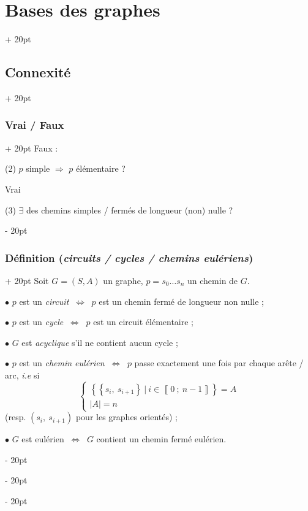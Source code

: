 \documentclass[a4paper, 12pt, twoside]{article}
\newcommand{\nset}[2]{\left\llbracket #1\ ;\ #2 \right\rrbracket}
\newcommand{\set}[1]{\left\{ #1 \right\}}
\newcommand{\abs}[1]{\left\lvert #1 \right\rvert}
\newcommand{\ssi}{\ \Leftrightarrow \ }
\newcommand{\eqsys}[2]{\begin{cases} #1 \\ #2 \end{cases}}
\newcommand{\ind}[1][20pt]{\advance\leftskip + #1}
\newcommand{\deind}[1][20pt]{\advance\leftskip - #1}
\newenvironment{indt}[2][20pt]{#2 \par \ind[#1]}{\par \deind} %
\begin{document}
\begin{indt}{\section{Bases des graphes}}
\begin{indt}{\subsection{Connexité}}
\begin{indt}{\subsubsection{Vrai / Faux}}
                Faux :

                \begin{center}
                \end{center}

                \vspace{12pt}
                
                (2) $p$ simple $\Rightarrow$ $p$ élémentaire ?

                Vrai

                (3) $\exists$ des chemins simples / fermés de longueur (non) nulle ?
            \end{indt}

            \vspace{12pt}
            
            \begin{indt}{\subsubsection{Définition (\textit{circuits / cycles / chemins eulériens})}}
                Soit $G = (S, A)$ un graphe, $p = s_0 \ldots s_n$ un chemin de $G$.

                $\bullet$ $p$ est un \textit{circuit} $\ssi$ $p$ est un chemin fermé de longueur non nulle ;

                $\bullet$ $p$ est un \textit{cycle} $\ssi$ $p$ est un circuit élémentaire ;

                $\bullet$ $G$ est \textit{acyclique} s'il ne contient aucun cycle ;

                $\bullet$ $p$ est un \textit{chemin eulérien} $\ssi$ $p$ passe exactement une fois par chaque arête / arc, \textit{i.e} si
                \[
                    \eqsys{\set{ \set{s_i,\ s_{i + 1}}\ |\ i \in \nset{0}{n - 1} } = A}{\abs A = n}
                \]
                (resp. $(s_i,\ s_{i + 1})$ pour les graphes orientés) ;

                $\bullet$ $G$ est eulérien $\ssi$ $G$ contient un chemin fermé eulérien.
            \end{indt}


\end{indt}
\end{indt}
\end{document}
